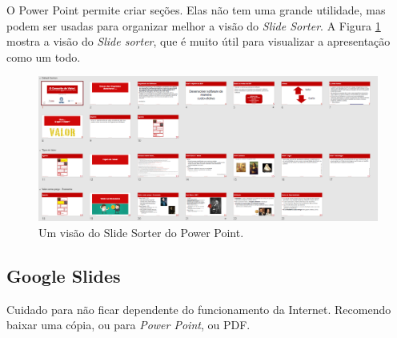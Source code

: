 O Power Point permite criar seções. Elas não tem uma grande utilidade, mas podem ser usadas para organizar melhor a visão do \textit{Slide Sorter}. A Figura \ref{fig:sorter} mostra a visão do \textit{Slide sorter}, que é muito útil para visualizar a apresentação como um todo.

\begin{figure}[tbh]
    \centering
    \includegraphics[width=0.7\linewidth]{imagens/slidesorter}
    \caption{Um visão do Slide Sorter do Power Point.}
    \label{fig:sorter}
\end{figure}



\subsection{Google Slides}

Cuidado para não ficar dependente do funcionamento da Internet. Recomendo baixar uma cópia, ou para \textit{Power Point}, ou PDF.






